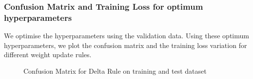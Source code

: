 \documentclass[10pt,a4paper]{article}
\begin{document}
\subsubsection{Confusion Matrix and Training Loss for optimum hyperparameters}

We optimise the hyperparameters using the validation data. 
Using these optimum hyperparameters, we plot the confusion matrix and the training loss variation for different weight update rules. 

\begin{figure}[H]
    \centering
    \qquad
    \caption{Confusion Matrix for Delta Rule on training and test dataset}%
    \label{fig:1}
\end{figure}
\end{document}

